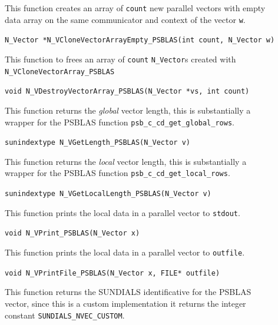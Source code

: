 \documentclass[twoside,a4paper]{refart}
\theoremstyle{definition}
\begin{document}
\begin{description}
	\item[] This function creates an array of \lstinline[style=CStyle]|count| new parallel vectors with empty data array on the same communicator and context of the vector \lstinline[style=CStyle]|w|.
	
	 \lstinline[style=CStyle]|N_Vector *N_VCloneVectorArrayEmpty_PSBLAS(int count, N_Vector w)|
	
	\item[] This function to frees an array of \lstinline[style=CStyle]|count| \texttt{N\_Vector}s created with \texttt{N\_VCloneVectorArray\_PSBLAS}
	
	 \lstinline[style=CStyle]|void N_VDestroyVectorArray_PSBLAS(N_Vector *vs, int count)|
	
	\item[] This function returns the \emph{global} vector length, this is substantially a wrapper for the PSBLAS function \lstinline[style=CStyle]|psb_c_cd_get_global_rows|.
	
	 \lstinline[style=CStyle]|sunindextype N_VGetLength_PSBLAS(N_Vector v)|
	
	\item[] This function returns the \emph{local} vector length, this is substantially a wrapper for the PSBLAS function \lstinline[style=CStyle]|psb_c_cd_get_local_rows|.
	
	 \lstinline[style=CStyle]|sunindextype N_VGetLocalLength_PSBLAS(N_Vector v)|
	
	\item[] This function prints the local data in a parallel vector to \lstinline[style=CStyle]|stdout|.
	
	 \lstinline[style=CStyle]|void N_VPrint_PSBLAS(N_Vector x)|
	
	\item[] This function prints the local data in a parallel vector to \lstinline[style=CStyle]|outfile|.
	
	 \lstinline[style=CStyle]|void N_VPrintFile_PSBLAS(N_Vector x, FILE* outfile)|
	
	\item[] This function returns the SUNDIALS identificative for the PSBLAS vector, since this is a custom implementation it returns the integer constant \lstinline[style=CStyle]|SUNDIALS_NVEC_CUSTOM|.
	

\end{description}
\end{document}
